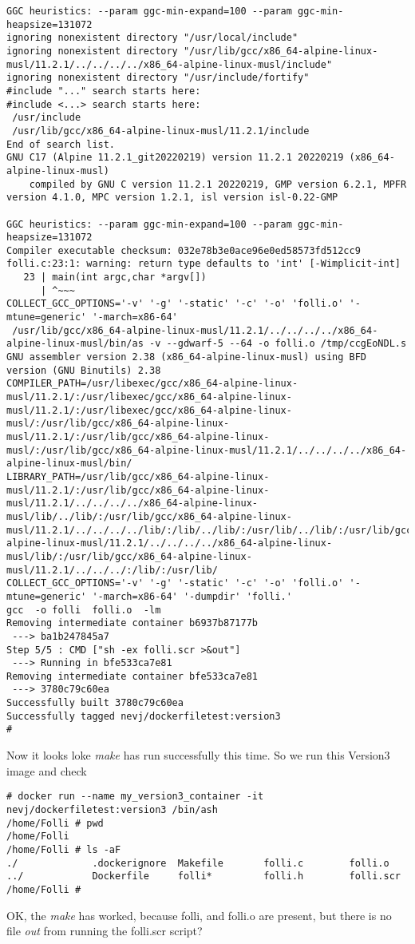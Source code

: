 \documentclass{article}  %
\begin{document}
\begin{verbatim}
GGC heuristics: --param ggc-min-expand=100 --param ggc-min-heapsize=131072
ignoring nonexistent directory "/usr/local/include"
ignoring nonexistent directory "/usr/lib/gcc/x86_64-alpine-linux-musl/11.2.1/../../../../x86_64-alpine-linux-musl/include"
ignoring nonexistent directory "/usr/include/fortify"
#include "..." search starts here:
#include <...> search starts here:
 /usr/include
 /usr/lib/gcc/x86_64-alpine-linux-musl/11.2.1/include
End of search list.
GNU C17 (Alpine 11.2.1_git20220219) version 11.2.1 20220219 (x86_64-alpine-linux-musl)
	compiled by GNU C version 11.2.1 20220219, GMP version 6.2.1, MPFR version 4.1.0, MPC version 1.2.1, isl version isl-0.22-GMP

GGC heuristics: --param ggc-min-expand=100 --param ggc-min-heapsize=131072
Compiler executable checksum: 032e78b3e0ace96e0ed58573fd512cc9
folli.c:23:1: warning: return type defaults to 'int' [-Wimplicit-int]
   23 | main(int argc,char *argv[])
      | ^~~~
COLLECT_GCC_OPTIONS='-v' '-g' '-static' '-c' '-o' 'folli.o' '-mtune=generic' '-march=x86-64'
 /usr/lib/gcc/x86_64-alpine-linux-musl/11.2.1/../../../../x86_64-alpine-linux-musl/bin/as -v --gdwarf-5 --64 -o folli.o /tmp/ccgEoNDL.s
GNU assembler version 2.38 (x86_64-alpine-linux-musl) using BFD version (GNU Binutils) 2.38
COMPILER_PATH=/usr/libexec/gcc/x86_64-alpine-linux-musl/11.2.1/:/usr/libexec/gcc/x86_64-alpine-linux-musl/11.2.1/:/usr/libexec/gcc/x86_64-alpine-linux-musl/:/usr/lib/gcc/x86_64-alpine-linux-musl/11.2.1/:/usr/lib/gcc/x86_64-alpine-linux-musl/:/usr/lib/gcc/x86_64-alpine-linux-musl/11.2.1/../../../../x86_64-alpine-linux-musl/bin/
LIBRARY_PATH=/usr/lib/gcc/x86_64-alpine-linux-musl/11.2.1/:/usr/lib/gcc/x86_64-alpine-linux-musl/11.2.1/../../../../x86_64-alpine-linux-musl/lib/../lib/:/usr/lib/gcc/x86_64-alpine-linux-musl/11.2.1/../../../../lib/:/lib/../lib/:/usr/lib/../lib/:/usr/lib/gcc/x86_64-alpine-linux-musl/11.2.1/../../../../x86_64-alpine-linux-musl/lib/:/usr/lib/gcc/x86_64-alpine-linux-musl/11.2.1/../../../:/lib/:/usr/lib/
COLLECT_GCC_OPTIONS='-v' '-g' '-static' '-c' '-o' 'folli.o' '-mtune=generic' '-march=x86-64' '-dumpdir' 'folli.'
gcc  -o folli  folli.o  -lm   
Removing intermediate container b6937b87177b
 ---> ba1b247845a7
Step 5/5 : CMD ["sh -ex folli.scr >&out"]
 ---> Running in bfe533ca7e81
Removing intermediate container bfe533ca7e81
 ---> 3780c79c60ea
Successfully built 3780c79c60ea
Successfully tagged nevj/dockerfiletest:version3
# 
\end{verbatim}
 Now it looks loke {\em make} has run successfully this time. So we run this Version3 image and check
\begin{verbatim}
# docker run --name my_version3_container -it nevj/dockerfiletest:version3 /bin/ash
/home/Folli # pwd
/home/Folli
/home/Folli # ls -aF
./             .dockerignore  Makefile       folli.c        folli.o
../            Dockerfile     folli*         folli.h        folli.scr
/home/Folli # 
\end{verbatim}
 OK, the {\em make} has worked, because folli, and folli.o are present, but there is no file {\em out} from running the folli.scr script? 
\end{document}
